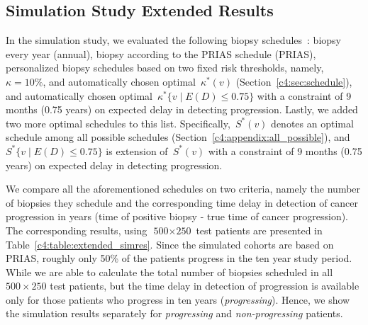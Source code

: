\begin{subappendices}
\section{Simulation Study Extended Results}
In the simulation study, we evaluated the following biopsy schedules~\citep{loeb2014heterogeneity, inoue2018comparative}: biopsy every year (annual), biopsy according to the PRIAS schedule (PRIAS), personalized biopsy schedules based on two fixed risk thresholds, namely,~$\kappa=10\%$, and automatically chosen optimal~$\kappa^*(v)$ (Section~\ref{c4:sec:schedule}), and automatically chosen optimal~${\kappa^*\{v \mid E(D)\leq 0.75\}}$ with a constraint of 9 months (0.75 years) on expected delay in detecting progression. Lastly, we added two more optimal schedules to this list. Specifically,~$S^*(v)$ denotes an optimal schedule among all possible schedules (Section~\ref{c4:appendix:all_possible}), and~$S^*\{v \mid E(D)\leq 0.75\}$ is extension of~$S^*(v)$ with a constraint of 9 months (0.75 years) on expected delay in detecting progression.

We compare all the aforementioned schedules on two criteria, namely the number of biopsies they schedule and the corresponding time delay in detection of cancer progression in years (time of positive biopsy - true time of cancer progression). The corresponding results, using~${\mbox{500} \times \mbox{250}}$ test patients are presented in Table~\ref{c4:table:extended_simres}. Since the simulated cohorts are based on PRIAS, roughly only 50\% of the patients progress in the ten year study period. While we are able to calculate the total number of biopsies scheduled in all~$500 \times 250$ test patients, but the time delay in detection of progression is available only for those patients who progress in ten years (\emph{progressing}). Hence, we show the simulation results separately for \emph{progressing} and \emph{non-progressing} patients.


\end{subappendices}
